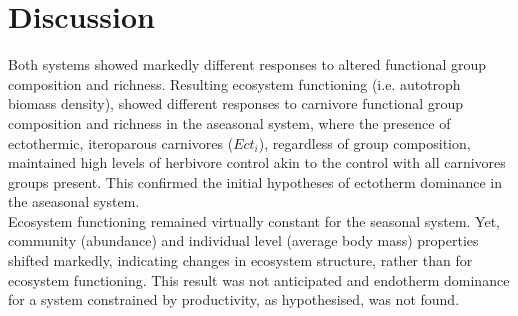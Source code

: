 \chapter{Discussion}
\label{chap:dis}
%
Both systems showed markedly different responses to altered functional group composition and richness. 
Resulting ecosystem functioning (i.e. autotroph biomass density), showed  different responses to carnivore functional group composition and richness in the aseasonal system, where the presence of ectothermic, iteroparous carnivores ($Ect_i$), regardless of group composition, maintained high levels of herbivore control akin to the control with all carnivores groups present. This confirmed the initial hypotheses of ectotherm dominance in the aseasonal system. \\
Ecosystem functioning remained virtually constant for the seasonal system. Yet, community (abundance) and individual level (average body mass) properties shifted markedly, indicating changes in ecosystem structure, rather than for ecosystem functioning. This result was not anticipated and endotherm dominance for a system constrained by productivity, as hypothesised, was not found. \\
 

